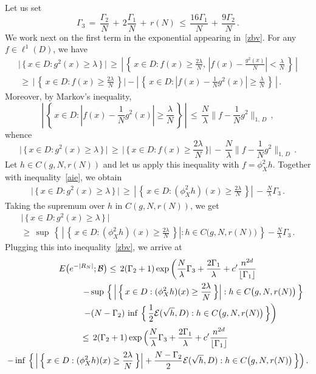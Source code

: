 \documentclass[10pt]{amsart}
\theoremstyle{definition}\newtheorem{defi}[theo]{Definition}\newtheorem{rema}[theo]{Remark}\newtheorem{exam}[theo]{Example}\newtheorem{exem}[theo]{Example}\newtheorem{nota}[theo]{Notation}
\newcommand{\cB}{\mathcal{B}}
\newcommand{\cE}{\mathcal{E}}
\begin{document}
Let us set
\begin{equation}\label{ultg}
\Gamma_3\,=\,
\frac{\Gamma_2}{{N}}\,+\, 2\frac{\Gamma_1}{{N}}\,+\, r(N)
\,\leq\,
\frac{16\Gamma_1}{{N}}\,+\,
\frac{9\Gamma_2}{{N}}
\,.
\end{equation}
We work next on the first term in the exponential appearing in~\eqref{zbv}. For any $f\in\ell^1(D)$, we have
\begin{align*}
\Big|\,\Big\{\,x\in D:g^2(x)\geq\lambda\,\Big\}\,\Big|\,\geq\,
\left|\,\left\{\,x\in D:f(x)\geq\frac{2\lambda}{N},\,
\left|f(x)-\frac{g^2(x)}{N}\right|<\frac{\lambda}{N}\,\right\}\,\right|\\
\,\geq\,
\Big|\,\left\{\,x\in D: f(x)\geq\frac{2\lambda}{N}
\,\right\}\Big|-
\left|\,\left\{\,x\in D:
\left|f(x)-\frac{1}{N}g^2(x)\right|\geq\frac{\lambda}{N}
\,\right\}\,\right|\,.
\end{align*}
Moreover, by Markov's inequality,
\[
\left|\,\left\{\,x\in D:
\left|f(x)-\frac{1}{N}g^2(x)\right|\geq\frac{\lambda}{N}
\,\right\}\,\right|\,\leq\,
\frac{N}{\lambda}\Big\| f-\frac{1}{N}g^2
\Big\|_{1,\,D}
\,,
\]
whence
\[
\Big|\,\Big\{\,x\in D:g^2(x)\geq\lambda\,\Big\}\,\Big|\,\geq\,
\Big|\,\Big\{\,x\in D: f(x)\geq\frac{2\lambda}{N}
\,\Big\}\Big|\,-\,
\frac{N}{\lambda}\Big\| f-\frac{1}{N}g^2
\Big\|_{1,\,D}\,.
\]
Let $h \in C(g,N, r(N))$ and let us apply this inequality with $f=\phi_X^2h$. Together with inequality~\eqref{aie}, we obtain
\begin{align*}
\Big|\,\Big\{\,x\in D:g^2(x)\geq\lambda\,\Big\}\,\Big|\,\geq\,
\left|\,\left\{\,x\in D: (\phi_X^2h)(x)\geq\frac{2\lambda}{N}
\,\right\}\right|\,-\,
\frac{N}{\lambda}\Gamma_3\,.
\end{align*}
Taking the supremum over $h$ in $C(g,N, r(N))$, we get
\begin{multline*}
\Big|\,\Big\{\,x\in D:g^2(x)\geq\lambda\,\Big\}\,\Big|\,
\\
\geq\,\sup\,\left\{\,
\left|\,\left\{\,x\in D: (\phi_X^2h)(x)\geq\frac{2\lambda}{N}
\,\right\}\right|: h\in C\big(g,N, r(N)\big)\,\right\} -\frac{N}{\lambda}\Gamma_3\,.
\end{multline*}
Plugging this into inequality~\eqref{zbv}, we arrive at
\begin{multline*}
E\big(e^{-|R_N|};\cB \big)
\leq\, 2(\Gamma_2+1)
\exp\bigg(
\frac{N}{\lambda}\Gamma_3 +\frac{2\Gamma_1}{\lambda} + c'\frac{n^{2d}}{\lfloor\Gamma_1\rfloor}
\\
\mkern150mu -\sup\,\Big\{\,
\Big|\,\Big\{\,x\in D: (\phi_X^2h)(x)\geq\frac{2\lambda}{N}
\,\Big\}\Big| : h\in C\big(g,N, r(N)\big)
\,\Big\}
\\
\mkern97mu-(N-\Gamma_2)\,\inf\,\Big\{\,
\frac{1} {2}\cE(\sqrt{h},D) : h\in C\big(g,N, r(N)\big)
\,\Big\}
\bigg)
\\
\mkern-10mu\leq\, 2(\Gamma_2+1)
\exp\Big(
\frac{N}{\lambda}\Gamma_3 +\frac{2\Gamma_1}{\lambda} + c'\frac{n^{2d}}{\lfloor\Gamma_1\rfloor}
\\
-
\inf\,\Big\{\,
\Big|\,\Big\{\,x\in D: (\phi_X^2h)(x)\geq\frac{2\lambda}{N}
\,\Big\}\Big|+
\frac{N-\Gamma_2}{2}\cE(\sqrt{h},D) : h\in C\big(g,N, r(N)\big)
\,\Big\}\Big)
\,.
\end{multline*}
\end{document}
